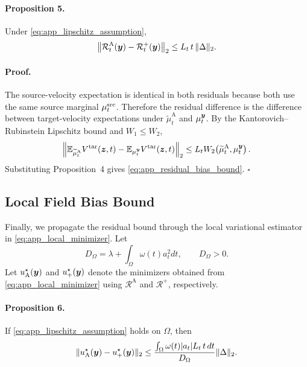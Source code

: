 \paragraph{Proposition 5.}
Under \eqref{eq:app_lipschitz_assumption},
\begin{equation}
    \label{eq:app_residual_bias_bound}
    \left\|
    \mathcal{R}_t^{\mathrm{A}}(\boldsymbol{y})
    -
    \mathcal{R}_t^{+}(\boldsymbol{y})
    \right\|_2
    \le
    L_t\,t\,\|\Delta\|_2.
\end{equation}

\paragraph{Proof.}
The source-velocity expectation is identical in both residuals because both use the same source marginal $\mu_t^{\mathrm{src}}$.
Therefore the residual difference is the difference between target-velocity expectations under $\widetilde{\mu}^{\mathrm{A}}_t$ and $\mu_t^{\boldsymbol{y}}$.
By the Kantorovich--Rubinstein Lipschitz bound and $W_1\le W_2$,
\begin{equation}
    \left\|
    \mathbb{E}_{\widetilde{\mu}^{\mathrm{A}}_t}
    V^{\mathrm{tar}}(\boldsymbol{z},t)
    -
    \mathbb{E}_{\mu_t^{\boldsymbol{y}}}
    V^{\mathrm{tar}}(\boldsymbol{z},t)
    \right\|_2
    \le
    L_t
    W_2\!\left(
    \widetilde{\mu}^{\mathrm{A}}_t,
    \mu_t^{\boldsymbol{y}}
    \right).
\end{equation}
Substituting Proposition~4 gives \eqref{eq:app_residual_bias_bound}.
\hfill$\square$

\subsection{Local Field Bias Bound}

Finally, we propagate the residual bound through the local variational estimator in \eqref{eq:app_local_minimizer}.
Let
\begin{equation}
    \label{eq:app_estimator_denominator}
    D_{\Omega}
    =
    \lambda+\int_{\Omega}\omega(t)a_t^2dt,
    \qquad
    D_{\Omega}>0.
\end{equation}
Let $u_{\mathrm{A}}^\star(\boldsymbol{y})$ and $u_+^\star(\boldsymbol{y})$ denote the minimizers obtained from \eqref{eq:app_local_minimizer} using $\mathcal{R}^{\mathrm{A}}$ and $\mathcal{R}^{+}$, respectively.

\paragraph{Proposition 6.}
If \eqref{eq:app_lipschitz_assumption} holds on $\Omega$, then
\begin{equation}
    \label{eq:app_field_bias_bound}
    \|u_{\mathrm{A}}^\star(\boldsymbol{y})-u_+^\star(\boldsymbol{y})\|_2
    \le
    \frac{
    \int_{\Omega}
    \omega(t)|a_t|L_t\,t\,dt
    }{
    D_{\Omega}
    }
    \|\Delta\|_2.
\end{equation}


